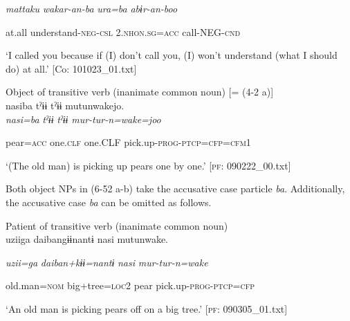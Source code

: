       \textit{mattaku}  \textit{wakar-an-ba}  \textit{ura=ba}  \textit{abɨr-an-boo}

      at.all  understand-\textsc{neg}-\textsc{csl}  2.\textsc{nhon}.\textsc{sg}=\textsc{acc}  call-NEG-\textsc{cnd}

\glt ‘I called you because if (I) don’t call you, (I) won’t understand (what I should do) at all.’ [Co: 101023\_01.txt]
\z

 \ex Object of transitive verb (inanimate common noun) [= (4-2 a)]\\
{\TM}
\gll  nasiba  tˀɨɨ  tˀɨɨ  mutunwakejo.\\

      \textit{nasi=ba}  \textit{tˀɨɨ}  \textit{tˀɨɨ}  \textit{mur-tur-n=wake=joo}

      pear=\textsc{acc}  one.\textsc{clf}  one.CLF  pick.up-\textsc{prog}-\textsc{ptcp}=\textsc{cfp}=\textsc{cfm}1

\glt ‘(The old man) is picking up pears one by one.’ [\textsc{pf}: 090222\_00.txt]
\z

Both object NPs in (6-52 a-b) take the accusative case particle \textit{ba}. Additionally, the accusative case \textit{ba} can be omitted as follows.

\ea\label{ex:6-53}
 Patient of transitive verb (inanimate common noun)\\

{\TM}
\gll uziiga  daibangɨɨnantɨ  nasi  mutunwake.

    \textit{uzii=ga}  \textit{daiban+kɨɨ=nantɨ}  \textit{nasi}  \textit{mur-tur-n=wake}

    old.man=\textsc{nom}  big+tree=\textsc{loc}2  pear  pick.up-\textsc{prog}-\textsc{ptcp}=\textsc{cfp}

\glt    ‘An old man is picking pears off on a big tree.’ [\textsc{pf}: 090305\_01.txt]
\z

